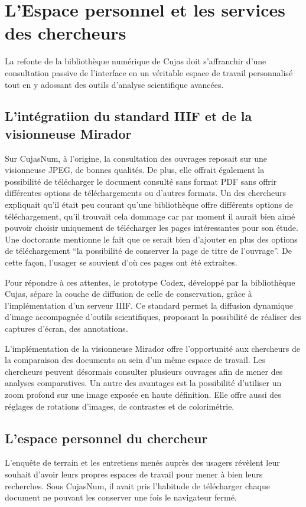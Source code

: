 \section{L'Espace personnel et les services des chercheurs}
La refonte de la bibliothèque numérique de Cujas doit s'affranchir d'une consultation passive de l'interface en un véritable espace de travail personnalisé tout en y adossant des outils d'analyse scientifique avancées.

\subsection{L'intégratiion du standard IIIF et de la visionneuse Mirador}
Sur CujasNum, à l'origine, la consultation des ouvrages reposait sur une visionneuse JPEG, de bonnes qualités. De plus, elle offrait également la possibilité de télécharger le document consulté sans format PDF sans offrir différentes options de téléchargements ou d'autres formats. Un des chercheurs expliquait qu'il était peu courant qu'une bibliothèque offre différents options de téléchargement, qu'il trouvait cela dommage car par moment il aurait bien aimé pouvoir choisir uniquement de télécharger les pages intéressantes pour son étude. Une doctorante mentionne le fait que ce serait bien d'ajouter en plus des options de téléchargement \enquote{la possibilité de conserver la page de titre de l'ouvrage}. De cette façon, l'usager se souvient d'où ces pages ont été extraites.

Pour répondre à ces attentes, le prototype Codex, développé par la bibliothèque Cujas, sépare la couche de diffusion de celle de conservation, grâce à l'implémentation d'un serveur IIIF. Ce standard permet la diffusion dynamique d'image accompagnée d'outils scientifiques, proposant la possibilité de réaliser des captures d'écran, des annotations.

L'implémentation de la visionneuse Mirador offre l'opportunité aux chercheurs de la comparaison des documents au sein d'un même espace de travail. Les chercheurs peuvent désormais consulter plusieurs ouvrages afin de mener des analyses comparatives. Un autre des avantages est la possibilité d'utiliser un zoom profond sur une image exposée en haute définition. Elle offre aussi des réglages de rotations d'images, de contrastes et de colorimétrie.

\subsection{L'espace personnel du chercheur}
L'enquête de terrain et les entretiens menés auprès des usagers révèlent leur souhait d'avoir leurs propres espaces de  travail pour mener à bien leurs recherches. Sous CujasNum, il avait pris l'habitude de télécharger chaque document ne pouvant les conserver une fois le navigateur fermé.

